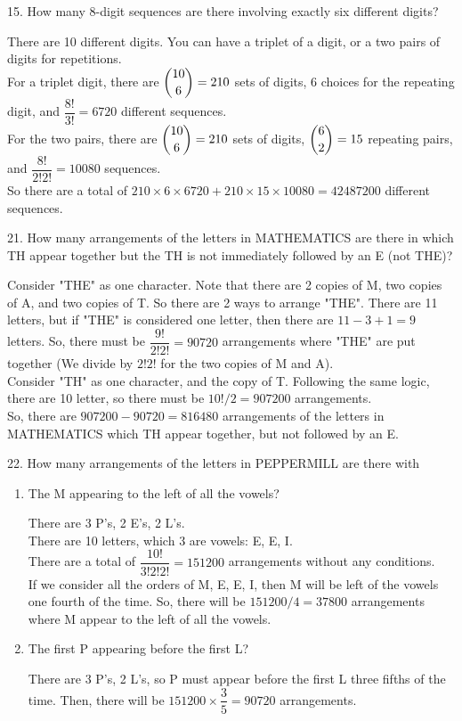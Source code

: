 \documentclass[12pt]{article}
\begin{document}
15. How many 8-digit sequences are there involving exactly six 
different digits?
\begin{solution}
    There are 10 different digits. You can have a triplet of a digit, or 
    a two pairs of digits for repetitions. \\
    For a triplet digit, 
    there are $\dbinom{10}{6} = 210$ sets of digits, 
    6 choices for the repeating digit,  
    and $\dfrac{8!}{3!}=6720$ different sequences.\\
    For the two pairs, 
    there are $\dbinom{10}{6} = 210$ sets of digits, 
    $\dbinom{6}{2}=15$ repeating pairs,  
    and $\dfrac{8!}{2!2!}=10080$ sequences. \\
    So there are a total of $210\times6\times6720 + 210\times15\times10080
    = 42487200$
    different sequences. 
\end{solution}
21. How many arrangements of the letters in MATHEMATICS are there in which
TH appear together but the TH is not immediately followed by an E (not THE)?
\begin{solution}
    Consider "THE" as one character. Note that there are 2 copies of M, 
    two copies of A, and two copies of T. 
    So there are 2 ways to arrange "THE". There are 11 letters, but if 
    "THE" is considered one letter, then there are $11-3+1=9$ letters. 
    So, there must be $\dfrac{9!}{2!2!} = 90720$ arrangements where "THE"
    are put 
    together (We divide by $2!2!$ for the two copies of M and A). \\
    Consider "TH" as one character, and the copy of T. Following the same
    logic, there are 10 letter, so there must be $10!/2 = 907200$ 
    arrangements. \\
    So, there are $907200-90720=816480$ arrangements of the letters in MATHEMATICS 
    which TH appear together, but not followed by an E. 
\end{solution}
22. How many arrangements of the letters in PEPPERMILL are there with \\
\begin{enumerate}[label=(\alph*)]
    \item The M appearing to the left of all the vowels?
    \begin{solution}
        There are 3 P's, 2 E's, 2 L's. \\
        There are 10 letters, which 3 are vowels: E, E, I. \\
        There are a total of $\dfrac{10!}{3!2!2!}=151200$ arrangements 
        without any conditions. \\
        If we consider all the orders of M, E, E, I, then M will be 
        left of the vowels one fourth of the time.  
        So, there will be $151200/4=37800$ arrangements where M appear to the 
        left of all the vowels. 
    \end{solution}
    \item The first P appearing before the first L?
    \begin{solution}
        There are 3 P's, 2 L's, so P must appear before the first L three
        fifths of the time. Then, there will be $151200\times\dfrac{3}{5}
        =90720$ arrangements. 
    \end{solution}
\end{enumerate}
\end{document}
